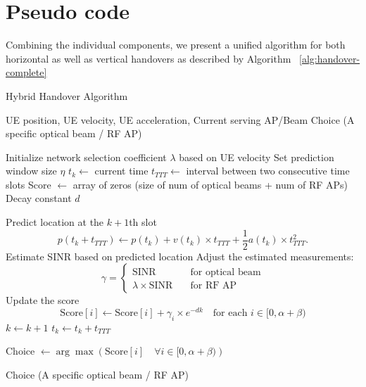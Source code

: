 \section{Pseudo code}
Combining the individual components, we present a unified algorithm for both horizontal as well as vertical handovers as described by Algorithm ~\ref{alg:handover-complete}
\begin{algorithm}
\caption{Hybrid Handover Algorithm}
\label{alg:handover-complete}
\begin{algorithmic}[1]
\REQUIRE UE position, UE velocity, UE acceleration, Current serving AP/Beam
\ENSURE Choice (A specific optical beam / RF AP)

\STATE Initialize network selection coefficient $\lambda$ based on UE velocity
\STATE Set prediction window size $\eta$
\STATE $t_k \leftarrow$ current time
\STATE $t_{TTT} \leftarrow$ interval between two consecutive time slots
\STATE Score $\leftarrow$ array of zeros (size of num of optical beams + num of RF APs)
\STATE Decay constant $d$

    \STATE Predict location at the $k+1$th slot
    \[
    p(t_k + t_{TTT}) \leftarrow p(t_k) + v(t_k) \times t_{TTT} + \frac{1}{2}a(t_k) \times t_{TTT}^2.
    \]
    \STATE Estimate SINR based on predicted location
    \STATE Adjust the estimated measurements:
    \[
    \gamma = 
    \begin{cases} 
    \text{SINR} \quad &\text{for optical beam} \\
    \lambda \times \text{SINR} \quad &\text{for RF AP}
    \end{cases}
    \]
    \STATE Update the score 
    \[
    \text{Score}[i] \leftarrow \text{Score}[i] + \gamma_i \times e^{-dk} \quad \text{for each } i \in [0, \alpha + \beta)
    \]
    \STATE $k \leftarrow k + 1$
    \STATE $t_k \leftarrow t_k + t_{TTT}$
\ENDWHILE

\STATE Choice $\leftarrow \arg \max\left(\text{Score}[i] \quad \forall i \in [0, \alpha + \beta)\right)$

\RETURN Choice (A specific optical beam / RF AP)
\end{algorithmic}
\end{algorithm}


